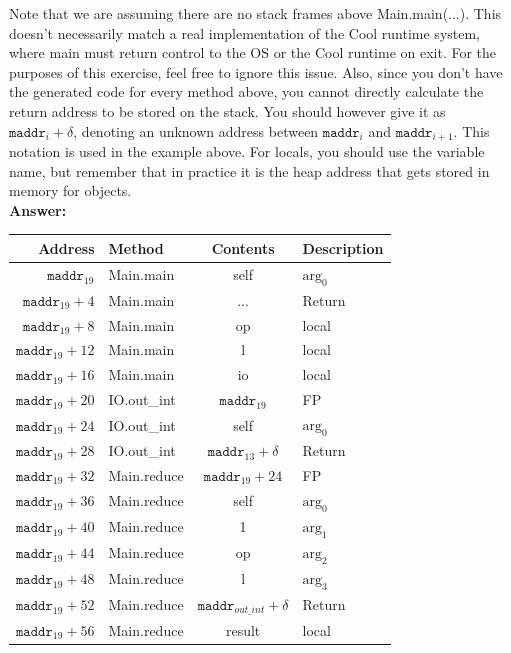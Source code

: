 \documentclass[11pt]{article}
\begin{document}
\begin{enumerate}
\begin{enumerate}
    Note that we are assuming there are no stack frames above Main.main(...). This doesn't necessarily match a real implementation of the Cool runtime system, where main must return control to the OS or the Cool runtime on exit. For the purposes of this exercise, feel free to ignore this issue. Also, since you don't have the generated code for every method above, you cannot directly calculate the return address to be stored on the stack. You should however give it as $\mathtt{maddr}_{i}+\delta$, denoting an unknown address between $\mathtt{maddr}_{i}$ and $\mathtt{maddr}_{i+1}$. This notation is used in the example above. For locals, you should use the variable name, but remember that in practice it is the heap address that gets stored in memory for objects.\\
    \textbf{Answer:} \\
    \begin{tabular}{ | r | l | c | l | }
    \hline
    Address & Method & Contents & Description \\
    \hline
    $\mathtt{maddr}_{19}$ & Main.main & self & $\mbox{arg}_0$ \\
    \hline
    $\mathtt{maddr}_{19}+4$ & Main.main & ... & Return \\
    \hline
    $\mathtt{maddr}_{19}+8$ & Main.main & op & local \\
    \hline
    $\mathtt{maddr}_{19}+12$ & Main.main & l & local \\
    \hline
    $\mathtt{maddr}_{19}+16$ & Main.main & io & local \\
    \hline
    $\mathtt{maddr}_{19}+20$ & IO.out\_int & $\mathtt{maddr}_{19}$ & FP \\
    \hline
    $\mathtt{maddr}_{19}+24$ & IO.out\_int & self & $\mbox{arg}_0$ \\
	\hline
    $\mathtt{maddr}_{19}+28$ & IO.out\_int & $\mathtt{maddr}_{13}+\delta$ & Return \\
    \hline
    $\mathtt{maddr}_{19}+32$ & Main.reduce & $\mathtt{maddr}_{19}+24$ & FP \\
    \hline
    $\mathtt{maddr}_{19}+36$ & Main.reduce & self & $\mbox{arg}_0$ \\
    \hline
    $\mathtt{maddr}_{19}+40$ & Main.reduce & 1 & $\mbox{arg}_1$ \\	
	\hline
    $\mathtt{maddr}_{19}+44$ & Main.reduce & op & $\mbox{arg}_2$ \\
	\hline
    $\mathtt{maddr}_{19}+48$ & Main.reduce & l & $\mbox{arg}_3$ \\
	\hline
    $\mathtt{maddr}_{19}+52$ & Main.reduce & $\mathtt{maddr}_{out\_int}+\delta$ & Return \\
	\hline
    $\mathtt{maddr}_{19}+56$ & Main.reduce & result & local \\
    \hline
    \end{tabular} \\
    

\end{enumerate}
\end{enumerate}
\end{document}
